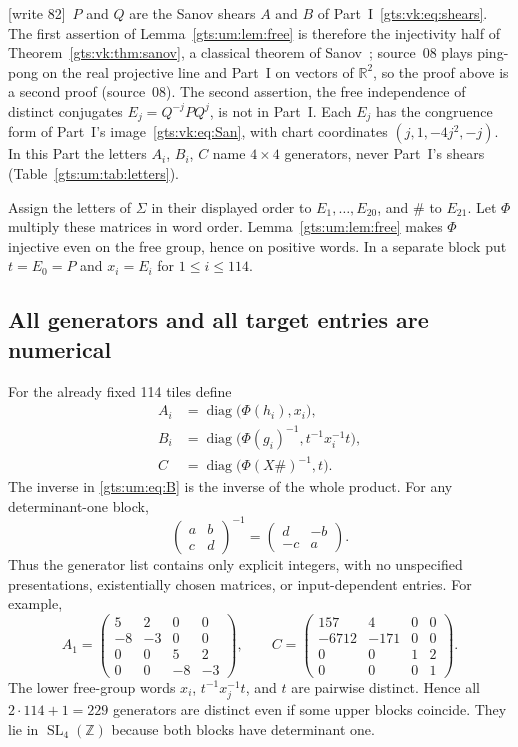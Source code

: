 \documentclass[11pt,letterpaper]{article}
\theoremstyle{definition}
\theoremstyle{remark}
\newcommand{\Z}{\mathbb Z}
\newcommand{\R}{\mathbb R}
\newcommand{\SL}{\operatorname{SL}}
\newcommand{\smallmat}[4]{\begin{pmatrix}#1&#2\\#3&#4\end{pmatrix}}
\newcommand{\diag}{\operatorname{diag}}
\newcommand{\wtagc}{\textup{[write 82]}}
\begin{document}
\wtagc\ $P$ and $Q$ are the Sanov shears $A$ and $B$ of Part~I~\eqref{gts:vk:eq:shears}. The first assertion of Lemma~\ref{gts:um:lem:free} is therefore the injectivity half of Theorem~\ref{gts:vk:thm:sanov}, a classical theorem of Sanov~\cite{sanov}; source~08 plays ping-pong on the real projective line and Part~I on vectors of $\R^2$, so the proof above is a second proof (source~08). The second assertion, the free independence of distinct conjugates $E_j=Q^{-j}PQ^j$, is not in Part~I. Each $E_j$ has the congruence form of Part~I's image~\eqref{gts:vk:eq:San}, with chart coordinates $(j,1,-4j^2,-j)$. In this Part the letters $A_i$, $B_i$, $C$ name $4\times4$ generators, never Part~I's shears (Table~\ref{gts:um:tab:letters}).

Assign the letters of $\Sigma$ in their displayed order to $E_1,\ldots,E_{20}$, and $\#$ to $E_{21}$. Let $\Phi$ multiply these matrices in word order. Lemma~\ref{gts:um:lem:free} makes $\Phi$ injective even on the free group, hence on positive words. In a separate block put $t=E_0=P$ and $x_i=E_i$ for $1\leq i\leq114$.

\subsection{All generators and all target entries are numerical}
For the already fixed 114 tiles define
\begin{align}
 A_i&=\diag\bigl(\Phi(h_i),x_i\bigr),\label{gts:um:eq:A}\\
 B_i&=\diag\bigl(\Phi(g_i)^{-1},t^{-1}x_i^{-1}t\bigr),\label{gts:um:eq:B}\\
 C&=\diag\bigl(\Phi(X\#)^{-1},t\bigr).\label{gts:um:eq:C}
\end{align}
The inverse in \eqref{gts:um:eq:B} is the inverse of the whole product. For any determinant-one block,
\[
 \smallmat{a}{b}{c}{d}^{-1}=\smallmat{d}{-b}{-c}{a}.
\]
Thus the generator list contains only explicit integers, with no unspecified presentations, existentially chosen matrices, or input-dependent entries. For example,
\[
 A_1=\begin{pmatrix}5&2&0&0\\-8&-3&0&0\\0&0&5&2\\0&0&-8&-3\end{pmatrix},\qquad
 C=\begin{pmatrix}157&4&0&0\\-6712&-171&0&0\\0&0&1&2\\0&0&0&1\end{pmatrix}.
\]
The lower free-group words $x_i$, $t^{-1}x_j^{-1}t$, and $t$ are pairwise distinct. Hence all $2\cdot114+1=229$ generators are distinct even if some upper blocks coincide. They lie in $\SL_4(\Z)$ because both blocks have determinant one.
\end{document}
